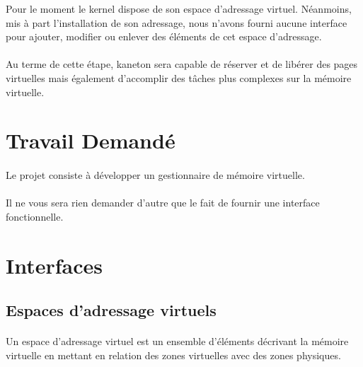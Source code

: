 \documentclass[10pt,a4wide]{article}
\begin{document}
Pour le moment le kernel dispose de son espace d'adressage virtuel.
N\'eanmoins, mis \`a part l'installation de son adressage, nous n'avons
fourni aucune interface pour ajouter, modifier ou enlever des \'el\'ements
de cet espace d'adressage.

\paragraph{}

Au terme de cette \'etape, kaneton sera capable de r\'eserver et
de lib\'erer des pages virtuelles mais \'egalement d'accomplir des t\^aches
plus complexes sur la m\'emoire virtuelle.

\section{Travail Demand\'e}

\paragraph{}

Le projet consiste \`a d\'evelopper un gestionnaire de m\'emoire virtuelle.

\paragraph{}

Il ne vous sera rien demander d'autre que le fait de fournir une interface
fonctionnelle.

\section{Interfaces}

\subsection{Espaces d'adressage virtuels}

\paragraph{}

Un espace d'adressage virtuel est un ensemble d'\'el\'ements d\'ecrivant
la m\'emoire virtuelle en mettant en relation des zones virtuelles avec des
zones physiques.

\paragraph{}
\end{document}
